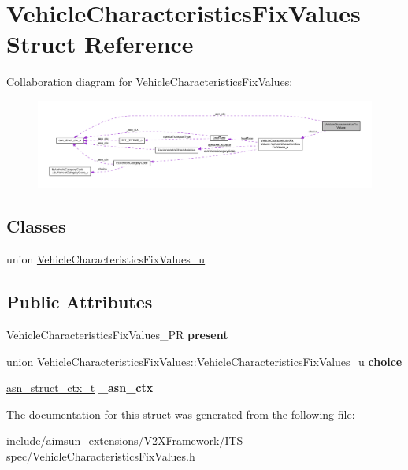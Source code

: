 \hypertarget{structVehicleCharacteristicsFixValues}{}\section{Vehicle\+Characteristics\+Fix\+Values Struct Reference}
\label{structVehicleCharacteristicsFixValues}


Collaboration diagram for Vehicle\+Characteristics\+Fix\+Values\+:\nopagebreak
\begin{figure}[H]
\begin{center}
\leavevmode
\includegraphics[width=350pt]{structVehicleCharacteristicsFixValues__coll__graph}
\end{center}
\end{figure}
\subsection*{Classes}
\begin{DoxyCompactItemize}
\item 
union \hyperlink{unionVehicleCharacteristicsFixValues_1_1VehicleCharacteristicsFixValues__u}{Vehicle\+Characteristics\+Fix\+Values\+\_\+u}
\end{DoxyCompactItemize}
\subsection*{Public Attributes}
\begin{DoxyCompactItemize}
\item 
Vehicle\+Characteristics\+Fix\+Values\+\_\+\+PR {\bfseries present}\hypertarget{structVehicleCharacteristicsFixValues_af2f697edb088e10fa5251ddd83ec35df}{}\label{structVehicleCharacteristicsFixValues_af2f697edb088e10fa5251ddd83ec35df}

\item 
union \hyperlink{unionVehicleCharacteristicsFixValues_1_1VehicleCharacteristicsFixValues__u}{Vehicle\+Characteristics\+Fix\+Values\+::\+Vehicle\+Characteristics\+Fix\+Values\+\_\+u} {\bfseries choice}\hypertarget{structVehicleCharacteristicsFixValues_aa77405f7a4534b096753326ddff0bed4}{}\label{structVehicleCharacteristicsFixValues_aa77405f7a4534b096753326ddff0bed4}

\item 
\hyperlink{structasn__struct__ctx__s}{asn\+\_\+struct\+\_\+ctx\+\_\+t} {\bfseries \+\_\+asn\+\_\+ctx}\hypertarget{structVehicleCharacteristicsFixValues_a9f5a002d67a7f53ca05ba8d5b0d58f1c}{}\label{structVehicleCharacteristicsFixValues_a9f5a002d67a7f53ca05ba8d5b0d58f1c}

\end{DoxyCompactItemize}


The documentation for this struct was generated from the following file\+:\begin{DoxyCompactItemize}
\item 
include/aimsun\+\_\+extensions/\+V2\+X\+Framework/\+I\+T\+S-\/spec/Vehicle\+Characteristics\+Fix\+Values.\+h\end{DoxyCompactItemize}

